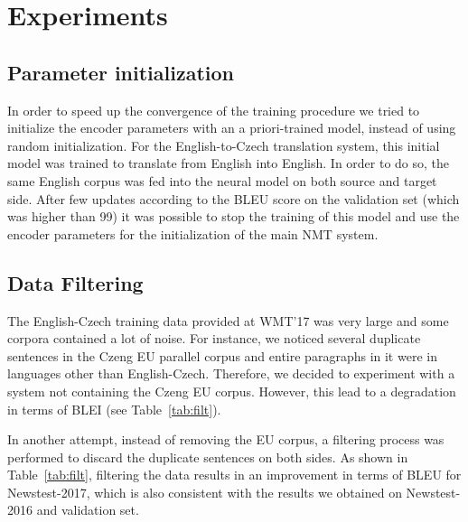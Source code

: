\documentclass[11pt,letterpaper,final]{article}
\begin{document}
\section{Experiments}

\subsection{Parameter initialization}
\label{subsec:autoenc}
In order to speed up the convergence of the training procedure we tried to initialize the encoder parameters with an a priori-trained model, instead of using random initialization. For the English-to-Czech translation system, this initial model was trained to translate from English into English. In order to do so, the same English corpus was fed into the neural model on both source and target side. After few updates according to the BLEU score on the validation set (which was higher than 99) it was possible to stop the training of this model and use the encoder parameters for the initialization of the main NMT system.

\subsection{Data Filtering}
\label{subsec:filter}

The English-Czech training data provided at WMT'17 
was very large and some corpora contained a lot of noise.
For instance, we noticed several duplicate sentences in the
Czeng EU parallel corpus and entire paragraphs in it were
in languages other than English-Czech.
Therefore, we decided to experiment with a system not
containing the Czeng EU corpus.
However, this lead to a degradation in terms of BLEI (see Table~\ref{tab:filt}). %

In another attempt, instead of removing the EU corpus, a filtering process was performed to discard the duplicate sentences on both sides. As shown in Table~\ref{tab:filt}, filtering the data results in an improvement in terms of BLEU for Newstest-2017, which is also consistent with the results we obtained on Newstest-2016 and validation set.
\end{document}

